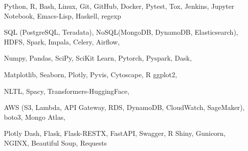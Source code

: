 


\begin{cvskills}


{
Python, R, Bash, Linux, Git, GitHub, Docker, Pytest, Tox, Jenkins, Jupyter Notebook, Emacs-Lisp, Haskell, regexp
}

{
SQL (PostgreSQL, Teradata), NoSQL(MongoDB, DynamoDB, Elasticsearch), HDFS, Spark, Impala, Celery, Airflow,
}

{
Numpy, Pandas, SciPy, SciKit Learn, Pytorch, Pyspark, Dask,
}

{
Matplotlib, Seaborn, Plotly, Pyvis, Cytoscape, R ggplot2,
}

{
NLTL, Spacy, Transformers-HuggingFace,
}

{
AWS (S3, Lambda, API Gateway, RDS, DynamoDB, CloudWatch, SageMaker), boto3, Mongo Atlas,
}

{
Plotly Dash, Flask, Flask-RESTX, FastAPI, Swagger, R Shiny, Gunicorn, NGINX, Beautiful Soup, Requests
}













\end{cvskills}
